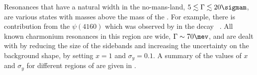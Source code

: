 \begin{table}
    \caption{
      Some particles properties for mesons, $X$, which decay into a dimuon pair final state, and
      the branching
      fractions for the relevant decays~\protect\cite{PDG2014}.
      Central values of mass and width are given in MeV.
    }
    \label{tab:db:bkg}
    \begin{center}
  \end{center}
\end{table}

Resonances that have a natural width in the no-mans-land, $5\lesssim\Gamma\lesssim20\sigmam$, are
various \ccbar states with masses above the mass of the \psitwos.
For example, there is contribution from the $\psi(4160)$ which was observed by \lhcb in the decay
\decay{\Bp}{\Kp\mumu}~\cite{LHCb-PAPER-2013-039}.
All known charmonium resonances in this region are wide,
$\Gamma\sim70\mev$, and are dealt with by reducing the size of the sidebands and increasing the
uncertainty on the background shape, by setting $x=1$ and $\sigma_y=0.1$.
A summary of the values of $x$ and $\sigma_y$ for different regions of  are given in
.

